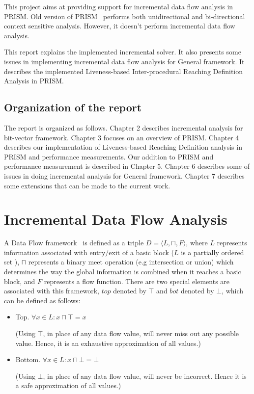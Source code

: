 \documentclass[11pt,a4paper,openright]{report}
\begin{document}
This project aims at providing support for incremental data flow analysis in PRISM.
Old version of PRISM~\cite{thesis_v} performs both unidirectional and bi-directional context sensitive analysis. 
However, it doesn't perform incremental data flow analysis.

This report explains the implemented incremental solver. It also presents some issues in implementing incremental data flow analysis for General
framework. It describes the implemented Liveness-based Inter-procedural Reaching Definition Analysis in PRISM.




\section{Organization of the report}
The report is organized as follows. Chapter 2 describes incremental analysis for bit-vector framework.
Chapter 3 focuses on an overview of PRISM. Chapter 4 describes our implementation of Liveness-based Reaching Definition analysis in 
PRISM and performance measurements. Our addition to PRISM and performance measurement is described in Chapter 5.
Chapter 6 describes some of issues in doing incremental analysis for General framework. Chapter 7 describes some extensions
that can be made to the current work. 


\chapter{Incremental Data Flow Analysis}
A Data Flow framework~\cite{thesis_sir} is defined as a triple $D =\langle L,\sqcap,F\rangle$, where $L$ represents information associated 
with entry/exit of a basic block ($L$ is a partially ordered set ), $\sqcap$ represents a binary meet operation (e.g intersection or union) 
which determines the way the global information is combined when it reaches a basic block, and $F$ represents a flow function. 
There are two special elements are associated with this framework, $top$ denoted by $\top$ and $bot$ denoted by $\bot$, 
which can be defined as follows:
\begin{itemize}
\item {Top.}
$\forall x \in L : x \sqcap \top = x $ 

(Using $\top$, in place of any data flow value, will never miss out any possible value. Hence, it is an exhaustive approximation of all values.)

\item {Bottom.}
$\forall x \in L : x \sqcap \bot =\bot $

(Using $\bot$, in place of any data flow value, will never be incorrect. Hence it is a safe approximation of all values.)


\end{itemize}
\end{document}
